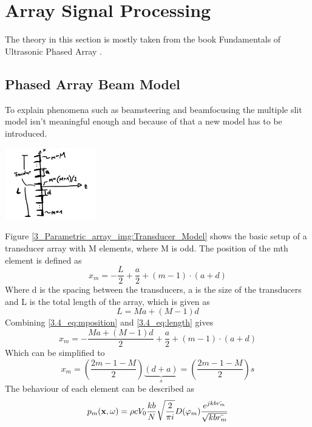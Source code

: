 \section{Array Signal Processing}\label{3_Parametric_array_Sec:Array_signal_processing}
The theory in this section is mostly taken from the book Fundamentals of Ultrasonic Phased Array \cite{alma99116706330905515}.
\subsection{Phased Array Beam Model}
To explain phenomena such as beamsteering and beamfocusing the multiple slit model isn't meaningful enough and because of that a new model has to be introduced. 
\begin{center}\label{3_Parametric_array_img:Transducer_Model}
    \includegraphics[width=0.3\textwidth]{images/3_Parametric_array/Sketch_TransducerModel.jpg}
\end{center}
Figure \ref{3_Parametric_array_img:Transducer_Model} shows the basic setup of a transducer array with M elements, where M is odd. The position of the mth element is defined as 
\begin{equation}\label{3.4_eq:mposition}
    x_m = -\frac{L}{2} + \frac{a}{2} + (m-1)\cdot(a+d)  
\end{equation}
Where d is the spacing between the transducers, a is the size of the transducers and L is the total length of the array, which is given as 
\begin{equation}\label{3.4_eq:length}
    L = Ma + (M-1)d
\end{equation}
Combining \ref{3.4_eq:mposition} and \ref{3.4_eq:length} gives
\begin{equation}
    x_m = -\frac{Ma + (M-1)d}{2} + \frac{a}{2} + (m-1)\cdot(a+d)  
\end{equation}
Which can be simplified to
\begin{equation}\label{3.4_eq:simplified_xm}
    x_m 
    = 
    \left ( \frac{2m -1 - M}{2} \right ) \underbrace{(d + a)}_{s}
    =
    \left ( \frac{2m -1 - M}{2} \right ) s
\end{equation}
The behaviour of each element can be described as 
\begin{equation}
    p_m(\textbf{x},\omega) 
    =
    \rho c V_0 \frac{k b}{N} \sqrt{\frac{2}{\pi i}} D(\varphi_{m}) \frac{e^{j k b \Bar{r_m}}}{\sqrt{k b \Bar{r_m}}}  
\end{equation}
